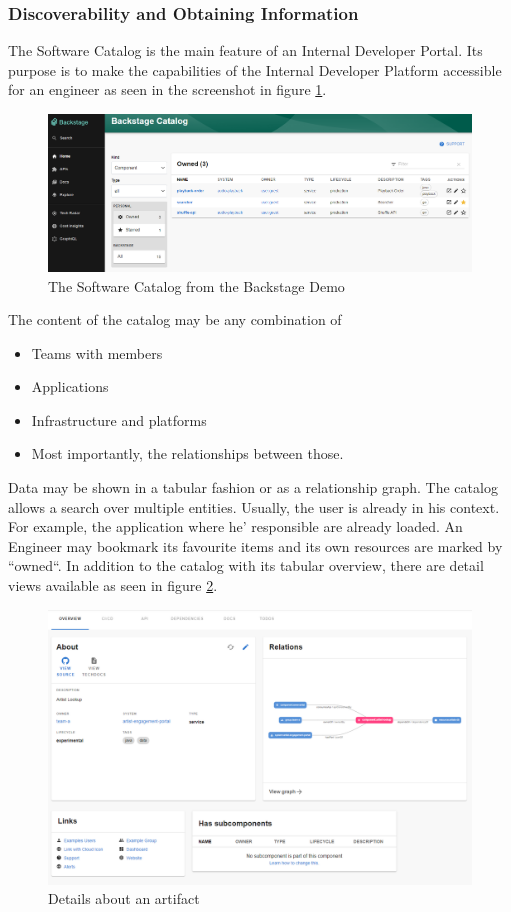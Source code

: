 \documentclass[a4paper,12pt]{article}
\begin{document}
    \subsubsection{Discoverability and Obtaining Information}
    \label{sssec:disc}
    The Software Catalog is the main feature of an Internal Developer Portal.
    Its purpose is to make the capabilities of the Internal Developer Platform accessible for an engineer as seen in the
    screenshot in figure \ref{fig:catalog}.

    \begin{figure}
        \includegraphics[width=\linewidth]{backstage_catalog}
        \caption{The Software Catalog from the Backstage Demo\parencite{backstagedemo}}
        \label{fig:catalog}
    \end{figure}
    The content of the catalog may be any combination of
    \begin{itemize}
        \item Teams with members
        \item Applications
        \item Infrastructure and platforms
        \item Most importantly, the relationships between those.
    \end{itemize}
    Data may be shown in a tabular fashion or as a relationship graph.
    The catalog allows a search over multiple entities.
    Usually, the user is already in his context.
    For example, the application where he' responsible are already loaded.
    An Engineer may bookmark its favourite items and its own resources are marked by ``owned``.
    In addition to the catalog with its tabular overview, there are detail views available as seen in figure \ref{fig:portaldetails}.
    \begin{figure}
        \includegraphics[width=\linewidth]{backstage_item_details}
        \caption{Details about an artifact}
        \label{fig:portaldetails}
    \end{figure}
\end{document}
